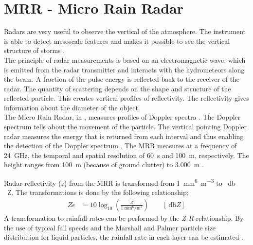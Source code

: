 \section{MRR - Micro Rain Radar}\label{sec:MRR}

Radars are very useful to observe the vertical of the atmosphere. The instrument is able to detect mesoscale features and makes it possible to see the vertical structure of storms \citep{markowski_mesoscale_2011}.\\
The principle of radar measurements is based on an electromagnetic wave, which is emitted from the radar transmitter and interacts with the hydrometeors along the beam. A fraction of the pulse energy is reflected back to the receiver of the radar. The quantity of scattering depends on the shape and structure of the reflected particle. This creates vertical profiles of reflectivity. The reflectivity gives information about the diameter of the object. 
\\
The Micro Rain Radar, in , measures profiles of Doppler spectra \citep{metek_micro_2010}. The Doppler spectrum tells about the movement of the particle. The vertical pointing Doppler radar measures the energy that is returned from each interval and thus enabling the detection of the Doppler spectrum \citep{lecuyer_aos_2017}. The MRR measures at a frequency of \SI{24}{\giga\Hz}, the temporal and spatial resolution of \SI{60}{\second} and \SI{100}{\metre}, respectively. The height ranges from \SI{100}{\metre} (because of ground clutter) to \SI{3.000}{\metre} \citep{metek_micro_2010}.

\newline \newline
\noindent 
Radar reflectivity ($z$) from the MRR is transformed from \SI{1}{\mm^6\per\metre^3} to \SI{}{\decibel\,Z}.
The transformations is done by the following relationship;
\begin{align}
	Ze & = 10 \log_{10} \left(\frac{Z}{\SI{1}{\mm^6\per\metre^3}}\right) \qquad [\SI{}{\decibel Z}]
	\label{eq:Ze}
\end{align}
A transformation to rainfall rates can be performed by the $Z$-$R$ relationship. By the use of typical fall speeds and the Marshall and Palmer particle size distribution for liquid particles, the rainfall rate in each layer can be estimated \citep{rinehart_radar_2010}. 
